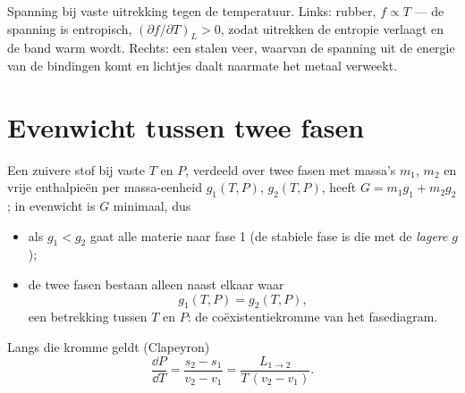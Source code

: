 \begin{omfigure}

{\small Spanning bij vaste uitrekking tegen de temperatuur. Links: rubber,
$f \propto T$ --- de spanning is entropisch, $(\partial f/\partial T)_L > 0$,
zodat uitrekken de entropie verlaagt en de band warm wordt. Rechts: een stalen
veer, waarvan de spanning uit de energie van de bindingen komt en lichtjes daalt
naarmate het metaal verweekt.}
\end{omfigure}

\section{Evenwicht tussen twee fasen}

\begin{theorem}\label{thm:b2:thermodynamic-potentials:coexistence}
Een zuivere stof bij vaste $T$ en $P$, verdeeld over twee fasen met
massa's $m_1$, $m_2$ en vrije enthalpieën per massa-eenheid $g_1(T,P)$,
$g_2(T,P)$, heeft $G = m_1g_1 + m_2g_2$; in evenwicht is $G$ minimaal, dus
\begin{itemize}
\item als $g_1 < g_2$ gaat alle materie naar fase 1 (de stabiele
      fase is die met de \emph{lagere} $g$);
\item de twee fasen bestaan alleen naast elkaar waar
      \[
      g_1(T,P) = g_2(T,P) ,
      \]
      een betrekking tussen $T$ en $P$: de coëxistentiekromme van het
      fasediagram.
\end{itemize}
Langs die kromme geldt (Clapeyron)
\[
\frac{\dd P}{\dd T} = \frac{s_2 - s_1}{v_2 - v_1} = \frac{L_{1\to2}}{T\,(v_2 - v_1)} .
\]
\end{theorem}

